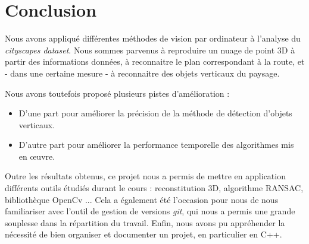 \documentclass[titlepage,11pt,a4paper]{article}
\begin{document}
\newpage \section{Conclusion}
\par Nous avons appliqué différentes méthodes de vision par ordinateur à l'analyse du \emph{cityscapes dataset}. Nous sommes parvenus à reproduire un nuage de point 3D à partir des informations données, à reconnaitre le plan correspondant à la route, et - dans une certaine mesure - à reconnaitre des objets verticaux du paysage.
\par Nous avons toutefois proposé plusieurs pistes d'amélioration :
\begin{itemize}
\item D'une part pour améliorer la précision de la méthode de détection d'objets verticaux.
\item D'autre part pour améliorer la performance temporelle des algorithmes mis en œuvre.
\end{itemize}

\par Outre les résultats obtenus, ce projet nous a permis de mettre en application différents outils étudiés durant le cours : reconstitution 3D, algorithme RANSAC, bibliothèque OpenCv ...
Cela a également été l'occasion pour nous de nous familiariser avec l'outil de gestion de versions \emph{git}, qui nous a permis une grande souplesse dans la répartition du travail.
Enfin, nous avons pu appréhender la nécessité de bien organiser et documenter un projet, en particulier en C++.


\par 
\end{document}
